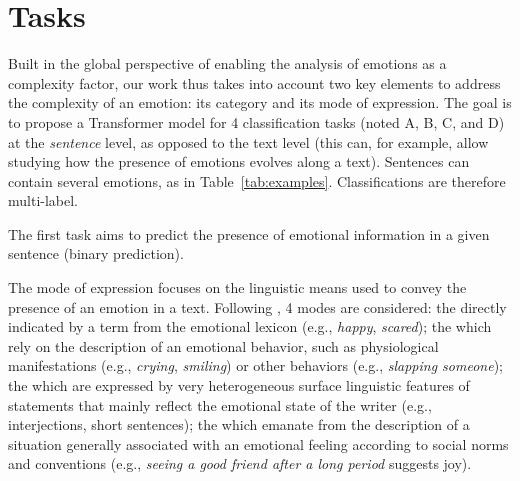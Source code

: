\section{Tasks}
\label{sec:tasks}

Built in the global perspective of enabling the analysis of emotions as a complexity factor, our work thus takes into account two key elements to address the complexity of an emotion: its category and its mode of expression. The goal is to propose a Transformer model for 4 classification tasks (noted A, B, C, and D) at the \textit{sentence} level, as opposed to the text level (this can, for example, allow studying how the presence of emotions evolves along a text). Sentences can contain several emotions, as in Table~\ref{tab:examples}. Classifications are therefore multi-label. 



\label{subsec:emo}
%
The first task aims to predict the presence of emotional information in a given sentence (binary prediction).


\label{subsec:mode}
%
The mode of expression focuses on the linguistic means used to convey the presence of an emotion in a text.
Following \citet{etienne_psycho-linguistically_2022}, 4 modes are considered:
the  directly indicated by a term from the emotional lexicon (e.g., \textit{happy}, \textit{scared}); the
 which rely on the description of an emotional behavior, such as physiological manifestations (e.g., \textit{crying}, \textit{smiling}) or other behaviors (e.g., \textit{slapping someone});
the  which are expressed by very heterogeneous surface linguistic features of statements that mainly reflect the emotional state of the writer (e.g., interjections, short sentences);
the  which emanate from the description of a situation generally associated with an emotional feeling according to social norms and conventions (e.g., \textit{seeing a good friend after a long period} suggests joy).



